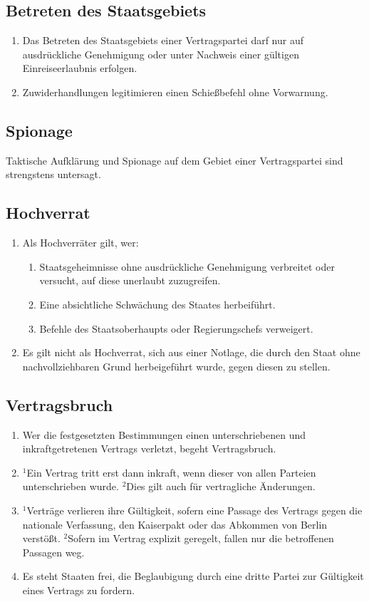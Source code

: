 \documentclass{article}
\begin{document}
\subsection{Betreten des Staatsgebiets}
\begin{enumerate}[(1)]
    \item Das Betreten des Staatsgebiets einer Vertragspartei darf nur auf ausdrückliche Genehmigung oder unter Nachweis einer gültigen Einreiseerlaubnis erfolgen.
    \item Zuwiderhandlungen legitimieren einen Schießbefehl ohne Vorwarnung.
\end{enumerate}

\subsection{Spionage}
Taktische Aufklärung und Spionage auf dem Gebiet einer Vertragspartei sind strengstens untersagt.

\subsection{Hochverrat}
\begin{enumerate}[(1)]
    \item Als Hochverräter gilt, wer:
    \begin{enumerate}[1.]
        \item Staatsgeheimnisse ohne ausdrückliche Genehmigung verbreitet oder versucht, auf diese unerlaubt zuzugreifen.
        \item Eine absichtliche Schwächung des Staates herbeiführt.
        \item Befehle des Staatsoberhaupts oder Regierungschefs verweigert.
    \end{enumerate}
    \item Es gilt nicht als Hochverrat, sich aus einer Notlage, die durch den Staat ohne nachvollziehbaren Grund herbeigeführt wurde, gegen diesen zu stellen.
\end{enumerate}

\subsection{Vertragsbruch}
\begin{enumerate}[(1)]
    \item Wer die festgesetzten Bestimmungen einen unterschriebenen und inkraftgetretenen Vertrags verletzt, begeht Vertragsbruch.
    \item ${^1}$Ein Vertrag tritt erst dann inkraft, wenn dieser von allen Parteien unterschrieben wurde. ${^2}$Dies gilt auch für vertragliche Änderungen.
    \item ${^1}$Verträge verlieren ihre Gültigkeit, sofern eine Passage des Vertrags gegen die nationale Verfassung, den Kaiserpakt oder das Abkommen von Berlin verstößt. ${^2}$Sofern im Vertrag explizit geregelt, fallen nur die betroffenen Passagen weg.
    \item Es steht Staaten frei, die Beglaubigung durch eine dritte Partei zur Gültigkeit eines Vertrags zu fordern.
\end{enumerate}
\end{document}
